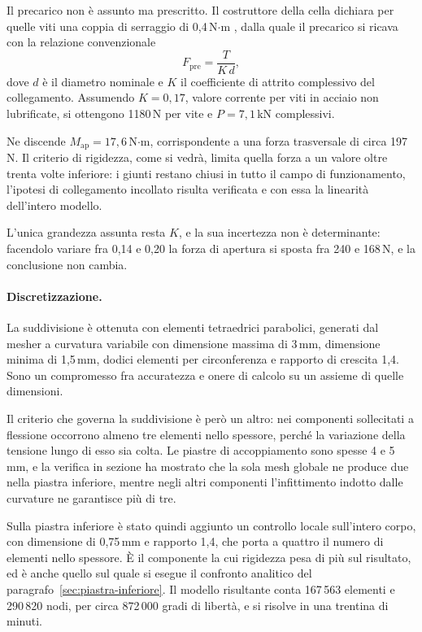 Il precarico non è assunto ma prescritto. Il costruttore della cella dichiara
per quelle viti una coppia di serraggio di 0,4\,N$\cdot$m
\cite{interface6amount}, dalla quale il precarico si ricava con la relazione
convenzionale
\begin{equation}
    F_{\mathrm{pre}} = \frac{T}{K \, d} ,
\end{equation}
dove $d$ è il diametro nominale e $K$ il coefficiente di attrito complessivo del
collegamento. Assumendo $K = 0{,}17$, valore corrente per viti in acciaio non
lubrificate, si ottengono 1180\,N per vite e $P = 7{,}1$\,kN complessivi.

Ne discende $M_{\mathrm{ap}} = 17{,}6$\,N$\cdot$m, corrispondente a una forza
trasversale di circa 197\,N. Il criterio di rigidezza, come si vedrà, limita
quella forza a un valore oltre trenta volte inferiore: i giunti restano chiusi
in tutto il campo di funzionamento, l'ipotesi di collegamento incollato risulta
verificata e con essa la linearità dell'intero modello.

L'unica grandezza assunta resta $K$, e la sua incertezza non è determinante:
facendolo variare fra 0,14 e 0,20 la forza di apertura si sposta fra 240 e
168\,N, e la conclusione non cambia.

\paragraph{Discretizzazione.}
La suddivisione è ottenuta con elementi tetraedrici parabolici, generati dal
mesher a curvatura variabile con dimensione massima di 3\,mm, dimensione minima
di 1,5\,mm, dodici elementi per circonferenza e rapporto di crescita 1,4. Sono
un compromesso fra accuratezza e onere di calcolo su un assieme di quelle
dimensioni.

Il criterio che governa la suddivisione è però un altro: nei componenti
sollecitati a flessione occorrono almeno tre elementi nello spessore, perché la
variazione della tensione lungo di esso sia colta. Le piastre di accoppiamento
sono spesse 4 e 5\,mm, e la verifica in sezione ha mostrato che la sola mesh
globale ne produce due nella piastra inferiore, mentre negli altri componenti
l'infittimento indotto dalle curvature ne garantisce più di tre.

Sulla piastra inferiore è stato quindi aggiunto un controllo locale sull'intero
corpo, con dimensione di 0,75\,mm e rapporto 1,4, che porta a quattro il numero
di elementi nello spessore. È il componente la cui rigidezza pesa di più sul
risultato, ed è anche quello sul quale si esegue il confronto analitico del
paragrafo~\ref{sec:piastra-inferiore}. Il modello risultante conta 167\,563
elementi e 290\,820 nodi, per circa 872\,000 gradi di libertà, e si risolve in
una trentina di minuti.

